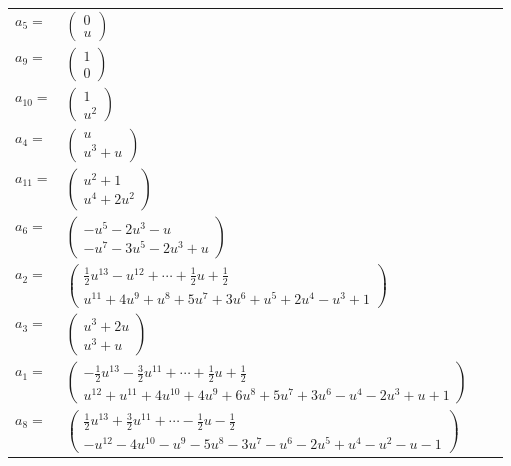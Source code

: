 \documentclass[1p]{elsarticle_modified}
\theoremstyle{definition}
\begin{document}
\begin{tabular}{m{7pt} m{180pt} m{7pt} m{180pt} }
\flushright $a_{5}=$&$\begin{pmatrix}0\\u\end{pmatrix}$ \\
\flushright $a_{9}=$&$\begin{pmatrix}1\\0\end{pmatrix}$ \\
\flushright $a_{10}=$&$\begin{pmatrix}1\\u^2\end{pmatrix}$ \\
\flushright $a_{4}=$&$\begin{pmatrix}u\\u^3+u\end{pmatrix}$ \\
\flushright $a_{11}=$&$\begin{pmatrix}u^2+1\\u^4+2 u^2\end{pmatrix}$ \\
\flushright $a_{6}=$&$\begin{pmatrix}- u^5-2 u^3- u\\- u^7-3 u^5-2 u^3+u\end{pmatrix}$ \\
\flushright $a_{2}=$&$\begin{pmatrix}\frac{1}{2} u^{13}- u^{12}+\cdots+\frac{1}{2} u+\frac{1}{2}\\u^{11}+4 u^9+u^8+5 u^7+3 u^6+u^5+2 u^4- u^3+1\end{pmatrix}$ \\
\flushright $a_{3}=$&$\begin{pmatrix}u^3+2 u\\u^3+u\end{pmatrix}$ \\
\flushright $a_{1}=$&$\begin{pmatrix}-\frac{1}{2} u^{13}-\frac{3}{2} u^{11}+\cdots+\frac{1}{2} u+\frac{1}{2}\\u^{12}+u^{11}+4 u^{10}+4 u^9+6 u^8+5 u^7+3 u^6- u^4-2 u^3+u+1\end{pmatrix}$ \\
\flushright $a_{8}=$&$\begin{pmatrix}\frac{1}{2} u^{13}+\frac{3}{2} u^{11}+\cdots-\frac{1}{2} u-\frac{1}{2}\\- u^{12}-4 u^{10}- u^9-5 u^8-3 u^7- u^6-2 u^5+u^4- u^2- u-1\end{pmatrix}$ \\

\end{tabular}
\end{document}
